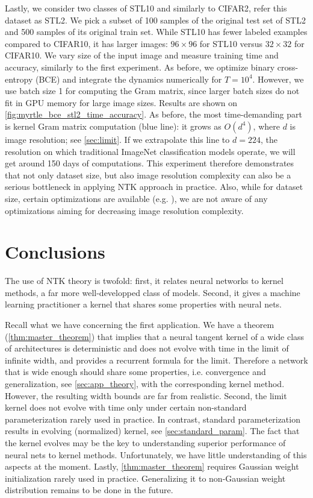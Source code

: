 \documentclass{article}
\begin{document}
    Lastly, we consider two classes of STL10 and similarly to CIFAR2, refer this dataset as STL2.
    We pick a subset of 100 samples of the original test set of STL2 and 500 samples of its original train set.
    While STL10 has fewer labeled examples compared to CIFAR10, it has larger images: $96 
    \times 96$ for STL10 versus $32 \times 32$ for CIFAR10.
    We vary size of the input image and measure training time and accuracy, similarly to the first experiment.
    As before, we optimize binary cross-entropy (BCE) and integrate the dynamics numerically for $T = 10^4$.
    However, we use batch size 1 for computing the Gram matrix, since larger batch sizes do not fit in GPU memory for large image sizes.
    Results are shown on \cref{fig:myrtle_bce_stl2_time_accuracy}.
    As before, the most time-demanding part is kernel Gram matrix computation (blue line): it grows as $O(d^4)$, where $d$ is image resolution; see \cref{sec:limit}.
    If we extrapolate this line to $d=224$, the resolution on which traditional ImageNet classification models operate, we will get around 150 days of computations.
    This experiment therefore demonstrates that not only dataset size, but also image resolution complexity can also be a serious bottleneck in applying NTK approach in practice.
    Also, while for dataset size, certain optimizations are available (e.g. \cite{meanti2020kernel}), we are not aware of any optimizations aiming for decreasing image resolution complexity.


    \section{Conclusions}

    The use of NTK theory is twofold: first, it relates neural networks to kernel methods, a far more well-developped class of models.
    Second, it gives a machine learning practitioner a kernel that shares some properties with neural nets.
    
    Recall what we have concerning the first application.
    We have a theorem (\cref{thm:master_theorem}) that implies that a neural tangent kernel of a wide class of architectures is deterministic and does not evolve with time in the limit of infinite width, and provides a recurrent formula for the limit.
    Therefore a network that is wide enough should share some properties, i.e. convergence and generalization, see \cref{sec:app_theory}, with the corresponding kernel method.
    However, the resulting width bounds are far from realistic.
    Second, the limit kernel does not evolve with time only under certain non-standard parameterization rarely used in practice.
    In contrast, standard parameterization results in evolving (normalized) kernel, see \cref{sec:standard_param}.
    The fact that the kernel evolves may be the key to understanding superior performance of neural nets to kernel methods.
    Unfortunately, we have little understanding of this aspects at the moment.
    Lastly, \cref{thm:master_theorem} requires Gaussian weight initialization rarely used in practice.
    Generalizing it to non-Gaussian weight distribution remains to be done in the future.
\end{document}
